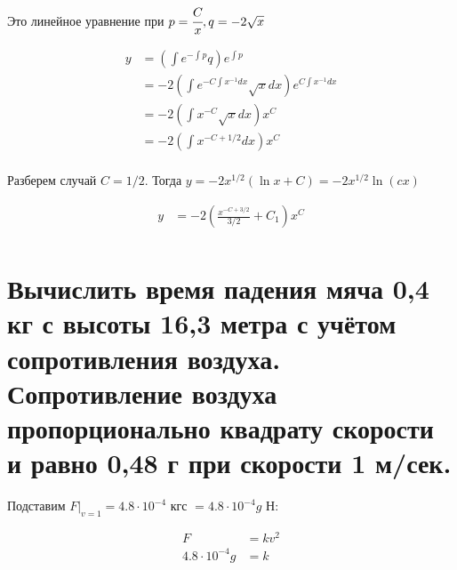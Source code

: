 Это линейное уравнение при $p = \cfrac{C}{x}, q = -2\sqrt x$

\begin{align*}
    y & = \left(\int e^{-\int p}q\right)e^{\int p}                              \\
      & = -2\left(\int e^{-C\int x^{-1} dx}\sqrt x dx\right)e^{C\int x^{-1} dx} \\
      & = -2\left(\int x^{-C} \sqrt x dx\right)x^C                              \\
      & = -2\left(\int x^{-C+1/2} dx\right)x^C                                  \\
\end{align*}

Разберем случай $C=1/2$. Тогда $y=-2x^{1/2}(\ln x + C)=-2x^{1/2}\ln (cx)$

\begin{align*}
    y & = -2\left(\frac{x^{-C+3/2}}{3/2} + C_1\right)x^C \\
\end{align*}

\section{Вычислить время падения мяча 0,4 кг с высоты 16,3 метра с учётом сопротивления воздуха. Сопротивление воздуха пропорционально квадрату скорости и равно 0,48 г при скорости 1 м/сек. }

\begin{figure}[h]
    \centering
\end{figure}

Подставим $F\Big|_{v=1} = 4.8\cdot 10^{-4}$ кгс $= 4.8\cdot 10^{-4}g$ Н:

\begin{align*}
    F                 & = kv^2 \\
    4.8\cdot 10^{-4}g & = k    \\
\end{align*}

